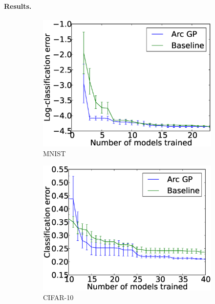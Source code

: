 \documentclass{article}
\begin{document}
\paragraph{Results.}
\begin{figure}[t!]
	\centering
	\begin{subfigure}[]{0.3\textwidth}
		\includegraphics[width=\textwidth]{figures/mnist.eps}
		\caption{MNIST}
		\label{fig:mnist}
	\end{subfigure}\quad
	\begin{subfigure}[]{0.3\textwidth}
		\includegraphics[width=\textwidth]{figures/cifar10.eps}
		\caption{CIFAR-10}
		\label{fig:cifar10}
	\end{subfigure}\quad
	\begin{subfigure}[]{0.3\textwidth}

\end{subfigure}
\end{figure}
\end{document}
